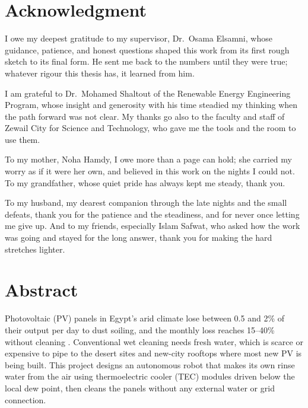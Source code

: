 \documentclass[12pt,a4paper]{report}   %
\begin{document}
\chapter*{Acknowledgment}
\thispagestyle{plain}

I owe my deepest gratitude to my supervisor, Dr.\ Osama Elsamni, whose guidance,
patience, and honest questions shaped this work from its first rough sketch to its
final form. He sent me back to the numbers until they were true; whatever rigour
this thesis has, it learned from him.

I am grateful to Dr.\ Mohamed Shaltout of the Renewable Energy Engineering Program,
whose insight and generosity with his time steadied my thinking when the path
forward was not clear. My thanks go also to the faculty and staff of Zewail City for
Science and Technology, who gave me the tools and the room to use them.

To my mother, Noha Hamdy, I owe more than a page can hold; she carried my worry as
if it were her own, and believed in this work on the nights I could not. To my
grandfather, whose quiet pride has always kept me steady, thank you.

To my husband, my dearest companion through the late nights and the small defeats,
thank you for the patience and the steadiness, and for never once letting me give
up. And to my friends, especially Islam Safwat, who asked how the work was going and
stayed for the long answer, thank you for making the hard stretches lighter.

\chapter*{Abstract}
\thispagestyle{plain}

Photovoltaic (PV) panels in Egypt's arid climate lose between 0.5 and 2\% of their
output per day to dust soiling, and the monthly loss reaches 15--40\% without
cleaning \cite{kazem2023soiling,sarver2013pvsoiling}. Conventional wet cleaning needs
fresh water, which is scarce or expensive to pipe to the desert sites and new-city
rooftops where most new PV is being built. This project designs an autonomous robot
that makes its own rinse water from the air using thermoelectric cooler (TEC) modules
driven below the local dew point, then cleans the panels without any external water
or grid connection.
\end{document}
